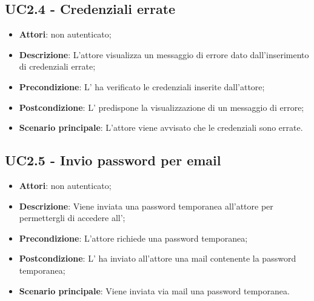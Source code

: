 \subsection{UC2.4 - Credenziali errate}
\label{ssec:UC2.4}
\begin{itemize}
\item \textbf{Attori}:  non autenticato;
\item \textbf{Descrizione}: L’attore visualizza un messaggio di errore dato dall’inserimento di credenziali errate;
\item \textbf{Precondizione}: L' ha verificato le credenziali inserite dall’attore;
\item \textbf{Postcondizione}: L' predispone la visualizzazione di un messaggio di errore;
\item \textbf{Scenario principale}: L'attore viene avvisato che le credenziali sono errate.
\end{itemize}
\subsection{UC2.5 - Invio password per email}
\label{ssec:UC2.5}
\begin{itemize}
\item \textbf{Attori}:  non autenticato;
\item \textbf{Descrizione}: Viene inviata una password temporanea all'attore per permettergli di accedere all';
\item \textbf{Precondizione}: L'attore richiede una password temporanea;
\item \textbf{Postcondizione}: L' ha inviato all'attore una mail contenente la password temporanea;
\item \textbf{Scenario principale}: Viene inviata via mail una password temporanea.
\end{itemize}
\newpage
